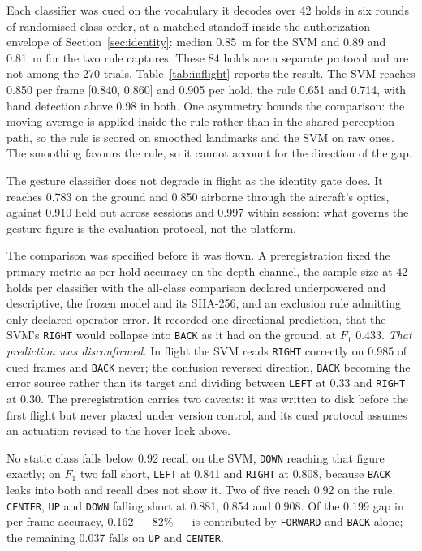 \documentclass[conference]{IEEEtran}
\begin{document}
Each classifier was cued on the vocabulary it decodes over 42 holds in six rounds of
randomised class order, at a matched standoff inside the authorization envelope
of Section~\ref{sec:identity}: median 0.85~m for the SVM and 0.89 and
0.81~m for the two rule captures.
These 84 holds are a separate protocol and are not among the 270 trials.
Table~\ref{tab:inflight} reports the result.
The SVM reaches 0.850 per frame [0.840, 0.860] and 0.905 per hold, the rule
0.651 and 0.714, with hand detection above 0.98 in both.
One asymmetry bounds the comparison: the moving average is applied inside the
rule rather than in the shared perception path, so the rule is scored on
smoothed landmarks and the SVM on raw ones.
The smoothing favours the rule, so it cannot account for the direction of the
gap.

The gesture classifier does not degrade in flight as the identity gate does.
It reaches 0.783 on the ground and 0.850 airborne through the aircraft's optics,
against 0.910 held out across sessions and 0.997 within session: what governs
the gesture figure is the evaluation protocol, not the platform.

The comparison was specified before it was flown.
A preregistration fixed the primary metric as per-hold accuracy on the depth
channel, the sample size at 42 holds per classifier with the all-class comparison
declared underpowered and descriptive, the frozen model and its SHA-256, and an
exclusion rule admitting only declared operator error.
It recorded one directional prediction, that the SVM's \texttt{RIGHT} would collapse into
\texttt{BACK} as it had on the ground, at $F_1$ 0.433.
\emph{That prediction was disconfirmed.}
In flight the SVM reads \texttt{RIGHT} correctly on 0.985 of cued frames and \texttt{BACK} never;
the confusion reversed direction, \texttt{BACK} becoming the error source rather than its
target and dividing between \texttt{LEFT} at 0.33 and \texttt{RIGHT} at 0.30.
The preregistration carries two caveats: it was written to disk before the
first flight but never placed under version control, and its cued protocol
assumes an actuation revised to the hover lock above.

No static class falls below 0.92 recall on the SVM, \texttt{DOWN} reaching that figure
exactly; on $F_1$ two fall short, \texttt{LEFT} at 0.841 and \texttt{RIGHT} at 0.808, because \texttt{BACK}
leaks into both and recall does not show it.
Two of five reach 0.92 on the rule, \texttt{CENTER}, \texttt{UP} and \texttt{DOWN} falling short at 0.881,
0.854 and 0.908.
Of the 0.199 gap in per-frame accuracy, 0.162 --- 82\% --- is contributed by
\texttt{FORWARD} and \texttt{BACK} alone; the remaining 0.037 falls on \texttt{UP} and \texttt{CENTER}.
\end{document}
